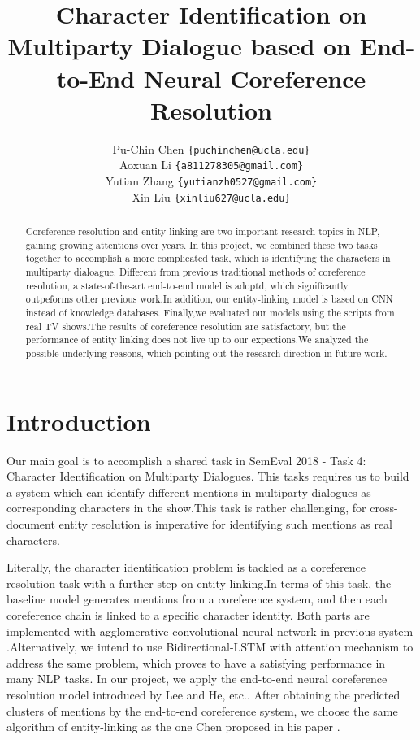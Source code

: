 \documentclass[11pt]{article}
\title{Character Identification on Multiparty Dialogue based on End-to-End Neural Coreference Resolution}
\author
{
   Pu-Chin Chen
  {\tt \{puchinchen@ucla.edu\}} \\
  Aoxuan Li 
  {\tt \{a811278305@gmail.com\}} \\
  Yutian Zhang
  {\tt \{yutianzh0527@gmail.com\}} \\
  Xin Liu
  {\tt \{xinliu627@ucla.edu\}} \\
}
\date{}
\begin{document}
\maketitle
\begin{abstract}
  Coreference resolution and entity linking are two important research topics in NLP, gaining growing attentions over years. In this project, we combined these two tasks together to accomplish a more complicated task, which is identifying the characters in multiparty dialoague. Different from previous traditional methods of coreference resolution, a state-of-the-art end-to-end model is adoptd, which significantly outpeforms other previous work.In addition, our entity-linking model is based on CNN instead of knowledge databases. Finally,we evaluated our models using the scripts from real TV shows.The results of coreference resolution are satisfactory, but the performance of entity linking does not live up to our expections.We analyzed the possible underlying reasons, which pointing out the research direction in future work.
\end{abstract}

\section{Introduction}

Our main goal is to accomplish a shared task in SemEval 2018 - Task 4: Character Identification on Multiparty Dialogues. This tasks requires us to build a system which can identify different mentions in multiparty dialogues as corresponding characters in the show.This task is rather challenging, for cross-document entity resolution is imperative for identifying such mentions as real characters.

Literally, the character identification problem is tackled as a coreference resolution task with a further step on entity linking.In terms of this task, the baseline model generates mentions from a coreference system, and then each coreference chain is linked to a specific character identity. Both parts are implemented with agglomerative convolutional neural network in previous system \cite{Robust,Character}.Alternatively, we intend to use Bidirectional-LSTM with attention mechanism to address the same problem, which proves to have a satisfying performance in many NLP tasks. In our project, we apply the end-to-end neural coreference resolution model introduced by Lee and He, etc.\cite{2017arXiv170707045L}. After obtaining the predicted clusters of mentions by the end-to-end coreference system, we choose the same algorithm of entity-linking as the one Chen proposed in his paper \cite{Robust}.
\end{document}
